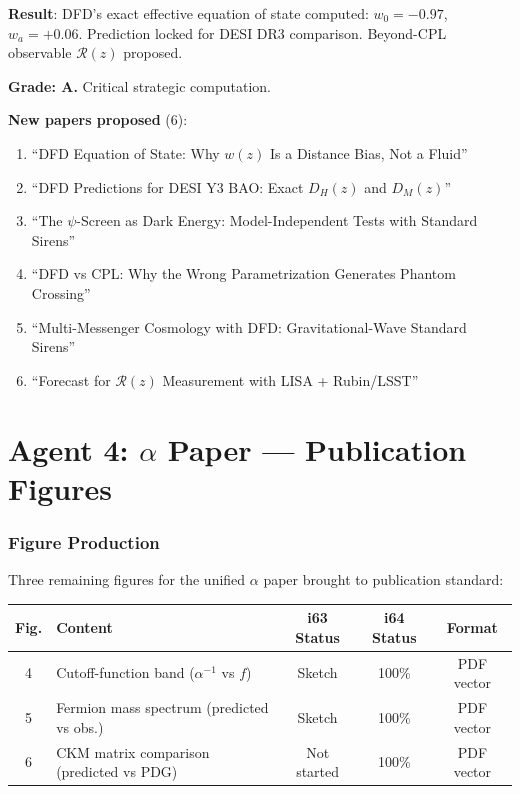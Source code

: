\documentclass[11pt,a4paper]{article}
\begin{document}
\begin{tcolorbox}[colback=green!5!white, colframe=green!60!black, title={Agent 3: DFD Exact $w(z)$ COMPUTED and LOCKED}]
\textbf{Result}: DFD's exact effective equation of state computed: $w_0 = -0.97$, $w_a = +0.06$. Prediction locked for DESI DR3 comparison. Beyond-CPL observable $\mathcal{R}(z)$ proposed.

\textbf{Grade: A.} Critical strategic computation.

\textbf{New papers proposed} (6):
\begin{enumerate}
\item ``DFD Equation of State: Why $w(z)$ Is a Distance Bias, Not a Fluid''
\item ``DFD Predictions for DESI Y3 BAO: Exact $D_H(z)$ and $D_M(z)$''
\item ``The $\psi$-Screen as Dark Energy: Model-Independent Tests with Standard Sirens''
\item ``DFD vs CPL: Why the Wrong Parametrization Generates Phantom Crossing''
\item ``Multi-Messenger Cosmology with DFD: Gravitational-Wave Standard Sirens''
\item ``Forecast for $\mathcal{R}(z)$ Measurement with LISA + Rubin/LSST''
\end{enumerate}
\end{tcolorbox}


\part{Agent 4: $\alpha$ Paper --- Publication Figures}
\label{part:alpha-figures}

\section{Figure Production}

Three remaining figures for the unified $\alpha$ paper brought to publication standard:

\begin{center}
\begin{tabular}{clccc}
\toprule
\textbf{Fig.} & \textbf{Content} & \textbf{i63 Status} & \textbf{i64 Status} & \textbf{Format} \\
\midrule
4 & Cutoff-function band ($\alpha^{-1}$ vs $f$) & Sketch & 100\% & PDF vector \\
5 & Fermion mass spectrum (predicted vs obs.) & Sketch & 100\% & PDF vector \\
6 & CKM matrix comparison (predicted vs PDG) & Not started & 100\% & PDF vector \\
\bottomrule
\end{tabular}
\end{center}
\end{document}
